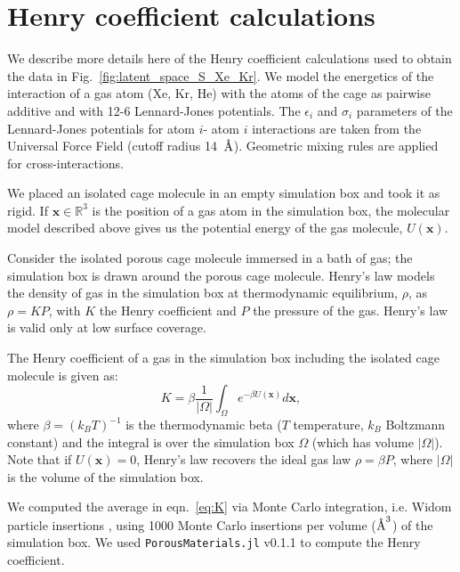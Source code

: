 \documentclass[journal=jacsat,manuscript=article]{achemso}
\newcommand{\angstrom}{\mbox{\normalfont\AA}}
\begin{document}
\newpage
\clearpage


\section{Henry coefficient calculations} \label{sec:henrydetails} We describe more details here of the Henry coefficient calculations used to obtain the data in Fig.~\ref{fig:latent_space_S_Xe_Kr}. We model the energetics of the interaction of a gas atom (Xe, Kr, He) with the atoms of the cage as pairwise additive and with 12-6 Lennard-Jones potentials. The $\epsilon_i$ and $\sigma_i$ parameters of the Lennard-Jones potentials for atom $i$- atom $i$ interactions are taken from the Universal Force Field \cite{rappe1992uff} (cutoff radius 14~$\angstrom$). Geometric mixing rules are applied for cross-interactions. 

We placed an isolated cage molecule in an empty simulation box and took it as rigid. If $\mathbf{x} \in \mathbb{R}^3$ is the position of a gas atom in the simulation box, the molecular model described above gives us the potential energy of the gas molecule, $U(\mathbf{x})$.

Consider the isolated porous cage molecule immersed in a bath of gas; the simulation box is drawn around the porous cage molecule. Henry's law models the density of gas in the simulation box at thermodynamic equilibrium, $\rho $, as $\rho=K P$, with $K$ the Henry coefficient and $P$ the pressure of the gas. Henry's law is valid only at low surface coverage.

The Henry coefficient of a gas in the simulation box including the isolated cage molecule is given as:
\begin{equation}
K = \beta \frac{1}{|\Omega|} \int_\Omega e^{-\beta U(\mathbf{x})} d\mathbf{x},
\label{eq:K}
\end{equation} where $\beta= (k_B T)^{-1}$ is the thermodynamic beta ($T$ temperature, $k_B$ Boltzmann constant) and the integral is over the simulation box $\Omega$ (which has volume $|\Omega|$). Note that if $U(\mathbf{x})=0$, Henry's law recovers the ideal gas law $\rho = \beta P$, where $|\Omega|$ is the volume of the simulation box.

We computed the average in eqn.~\ref{eq:K} via Monte Carlo integration, i.e. Widom particle insertions \cite{frenkel2001understanding}, using 1000 Monte Carlo insertions per volume ($\angstrom^3$) of the simulation box. We used \texttt{PorousMaterials.jl} v0.1.1 \cite{PorousMaterialsJL} to compute the Henry coefficient.
\end{document}

